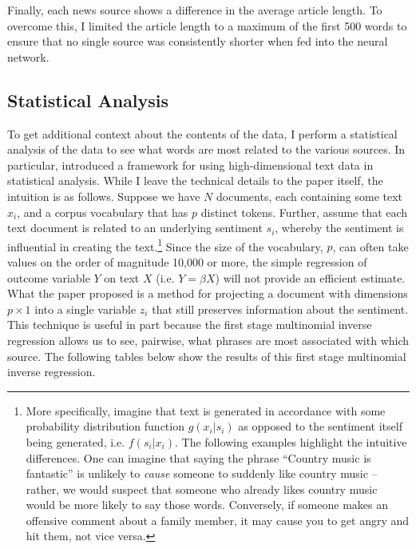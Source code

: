 \documentclass{article}
\begin{document}
	    Finally, each news source shows a difference in the average article length. To overcome this, I limited the article length to a maximum of the first 500 words to ensure that no single source was consistently shorter when fed into the neural network. 
	    
	    \subsection{Statistical Analysis}
	    To get additional context about the contents of the data, I perform a statistical analysis of the data to see what words are most related to the various sources. In particular, \citet{taddy2013multinomial} introduced a framework for using high-dimensional text data in statistical analysis. While I leave the technical details to the paper itself, the intuition is as follows. Suppose we have $N$ documents, each containing some text $x_i$, and a corpus vocabulary that has $p$ distinct tokens. Further, assume that each text document is related to an underlying sentiment $s_i$, whereby the sentiment is influential in creating the text.\footnote{More specifically, imagine that text is generated in accordance with some probability distribution function $g(x_i | s_i)$ as opposed to the sentiment itself being generated, i.e. $f(s_i | x_i)$. The following examples highlight the intuitive differences. One can imagine that saying the phrase ``Country music is fantastic'' is unlikely to \textit{cause} someone to suddenly like country music -- rather, we would suspect that someone who already likes country music would be more likely to say those words. Conversely, if someone makes an offensive comment about a family member, it may cause you to get angry and hit them, not vice versa.} Since the size of the vocabulary, $p$, can often take values on the order of magnitude 10,000 or more, the simple regression of outcome variable $Y$ on text $X$ (i.e. $Y= \beta X$) will not provide an efficient estimate. What the paper proposed is a method for projecting a document with dimensions $p \times 1$ into a single variable $z_i$ that still preserves information about the sentiment. This technique is useful in part because the first stage multinomial inverse regression allows us to see, pairwise, what phrases are most associated with which source. The following tables below show the results of this first stage multinomial inverse regression. 
	    
	    
	    
	    
		
\end{document}
